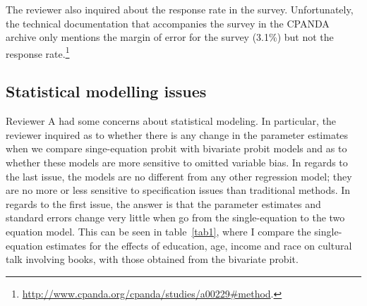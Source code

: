 \documentclass[11pt]{article}
\begin{document}
The reviewer also inquired about the response rate in the survey. Unfortunately, the technical documentation that accompanies the survey in the CPANDA archive only mentions the margin of error for the survey (3.1\%) but not the response rate.\footnote{\url{http://www.cpanda.org/cpanda/studies/a00229#method}.}

\subsection*{Statistical modelling issues}
Reviewer A had some concerns about statistical modeling.  In particular, the reviewer inquired as to whether there is any change in the parameter estimates when we compare singe-equation probit with bivariate probit models and as to whether these models are more sensitive to omitted variable bias.  In regards to the last issue, the models are no different from any other regression model; they are no more or less sensitive to specification issues than traditional methods.  In regards to the first issue, the answer is that the parameter estimates and standard errors change very little when go from the single-equation to the two equation model.  This can be seen in table~\ref{tab1}, where I compare the single-equation estimates for the effects of education, age, income and race on cultural talk involving books, with those obtained from the bivariate probit. 
\end{document}
